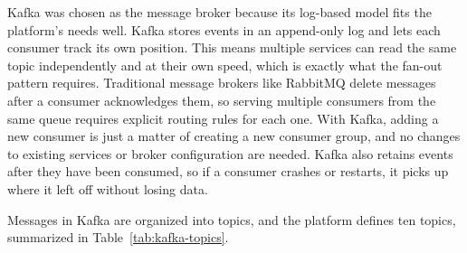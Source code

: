 Kafka was chosen as the message broker because its log-based model fits the platform's needs well. Kafka stores events in an append-only log and lets each consumer track its own position. This means multiple services can read the same topic independently and at their own speed, which is exactly what the fan-out pattern requires. Traditional message brokers like RabbitMQ delete messages after a consumer acknowledges them, so serving multiple consumers from the same queue requires explicit routing rules for each one. With Kafka, adding a new consumer is just a matter of creating a new consumer group, and no changes to existing services or broker configuration are needed. Kafka also retains events after they have been consumed, so if a consumer crashes or restarts, it picks up where it left off without losing data.

Messages in Kafka are organized into topics, and the platform defines ten topics, summarized in Table~\ref{tab:kafka-topics}.

